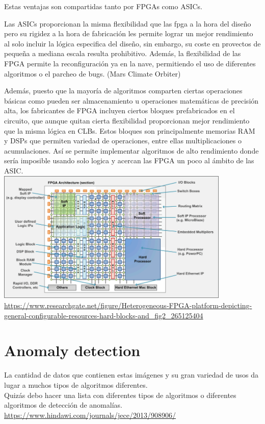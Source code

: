 Estas ventajas son compartidas tanto por FPGAs como ASICs.

Las ASICs proporcionan la misma flexibilidad que las fpga a la hora del diseño pero su rigidez a la hora de fabricación les permite lograr un mejor rendimiento al solo incluir la lógica especifica del diseño, sin embargo, su coste en provectos de pequeña a mediana escala resulta prohibitivo. Además, la flexibilidad de las FPGA permite la reconfiguración ya en la nave, permitiendo el uso de diferentes algoritmos o el parcheo de bugs. (Mars Climate Orbiter)

Además, puesto que la mayoría de algoritmos comparten ciertas operaciones básicas como pueden ser almacenamiento u operaciones matemáticas de precisión alta, los fabricantes de FPGA incluyen ciertos bloques prefabricados en el circuito, que aunque quitan cierta flexibilidad proporcionan mejor rendimiento que la misma lógica en CLBs. Estos bloques son principalmente memorias RAM y DSPs que permiten variedad de operaciones, entre ellas multiplicaciones o acumulaciones. Así se permite implementar algoritmos de alto rendimiento donde sería imposible usando solo logica y acercan las FPGA un poco al ámbito de las ASIC.
\\
\includegraphics[height=2.5in]{figures/FPGA_heterogenea.png}
\\
\url{https://www.researchgate.net/figure/Heterogeneous-FPGA-platform-depicting-general-configurable-resources-hard-blocks-and_fig2_265125404}


\section{Anomaly detection}

La cantidad de datos que contienen estas imágenes y su gran variedad de usos da lugar a muchos tipos de algoritmos diferentes.
\\
Quizás debo hacer una lista con diferentes tipos de algoritmos o diferentes algoritmos de detección de anomalías.
\\
\url{https://www.hindawi.com/journals/jece/2013/908906/}

